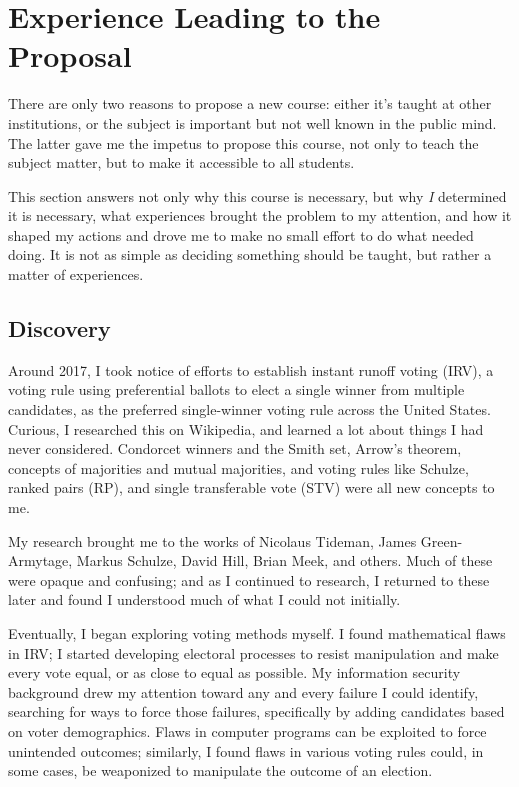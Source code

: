 \chapter{Experience Leading to the Proposal}

There are only two reasons to propose a new course:  either it's taught at other institutions, or the subject is important but not well known in the public mind.  The latter gave me the impetus to propose this course, not only to teach the subject matter, but to make it accessible to all students.

This section answers not only why this course is necessary, but why \textit{I} determined it is necessary, what experiences brought the problem to my attention, and how it shaped my actions and drove me to make no small effort to do what needed doing.  It is not as simple as deciding something should be taught, but rather a matter of experiences.

\section{Discovery}

Around 2017, I took notice of efforts to establish instant runoff voting (IRV), a voting rule using preferential ballots to elect a single winner from multiple candidates, as the preferred single-winner voting rule across the United States.  Curious, I researched this on Wikipedia, and learned a lot about things I had never considered.  Condorcet winners and the Smith set, Arrow's theorem, concepts of majorities and mutual majorities, and voting rules like Schulze, ranked pairs (RP), and single transferable vote (STV) were all new concepts to me.

My research brought me to the works of Nicolaus Tideman, James Green-Armytage, Markus Schulze, David Hill, Brian Meek, and others.  Much of these were opaque and confusing; and as I continued to research, I returned to these later and found I understood much of what I could not initially.

Eventually, I began exploring voting methods myself.  I found mathematical flaws in IRV; I started developing electoral processes to resist manipulation and make every vote equal, or as close to equal as possible.  My information security background drew my attention toward any and every failure I could identify, searching for ways to force those failures, specifically by adding candidates based on voter demographics.  Flaws in computer programs can be exploited to force unintended outcomes; similarly, I found flaws in various voting rules could, in some cases, be weaponized to manipulate the outcome of an election.

